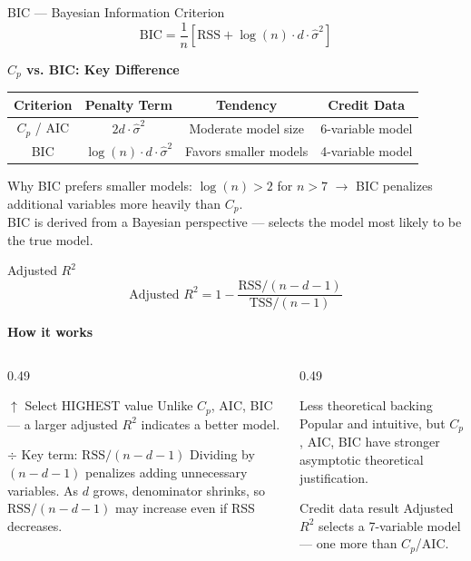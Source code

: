 \documentclass[ignorenonframetext,]{beamer}
\begin{document}
\begin{frame}{BIC --- Bayesian Information Criterion}
$$\mathrm{BIC} = \frac{1}{n}\left[\mathrm{RSS} + \log(n)\cdot d\cdot\hat{\sigma}^2\right]$$

\textbf{$C_p$ vs. BIC: Key Difference}
\begin{center}
\small
\begin{tabular}{cccc}
\toprule
\textbf{Criterion} & \textbf{Penalty Term} & \textbf{Tendency} & \textbf{Credit Data}\\
\midrule
$C_p$ / AIC & $2d\cdot\hat{\sigma}^2$ & Moderate model size & 6-variable model\\
BIC & $\log(n)\cdot d\cdot\hat{\sigma}^2$ & Favors smaller models & 4-variable model\\
\bottomrule
\end{tabular}
\end{center}

\begin{alertblock}{Why BIC prefers smaller models:}
\small
$\log(n) > 2$ for $n > 7$ $\rightarrow$ BIC penalizes additional variables more heavily than $C_p$.\\
BIC is derived from a Bayesian perspective --- selects the model most likely to be the true model.
\end{alertblock}
\end{frame}

\begin{frame}{Adjusted $R^2$}
$$\text{Adjusted } R^2 = 1 - \frac{\mathrm{RSS}/(n-d-1)}{\mathrm{TSS}/(n-1)}$$

\textbf{How it works}
\vspace{-4pt}
\begin{columns}[T]
\begin{column}{0.49\textwidth}
\scriptsize
\begin{block}{$\uparrow$ Select HIGHEST value}
Unlike $C_p$, AIC, BIC --- a larger adjusted $R^2$ indicates a better model.
\end{block}
\begin{block}{$\div$ Key term: $\mathrm{RSS}/(n-d-1)$}
Dividing by $(n-d-1)$ penalizes adding unnecessary variables. As $d$ grows, denominator shrinks, so $\mathrm{RSS}/(n-d-1)$ may increase even if RSS decreases.
\end{block}
\end{column}
\begin{column}{0.49\textwidth}
\scriptsize
\begin{alertblock}{Less theoretical backing}
Popular and intuitive, but $C_p$, AIC, BIC have stronger asymptotic theoretical justification.
\end{alertblock}
\begin{exampleblock}{Credit data result}
Adjusted $R^2$ selects a 7-variable model --- one more than $C_p$/AIC.
\end{exampleblock}
\end{column}
\end{columns}
\end{frame}
\end{document}
